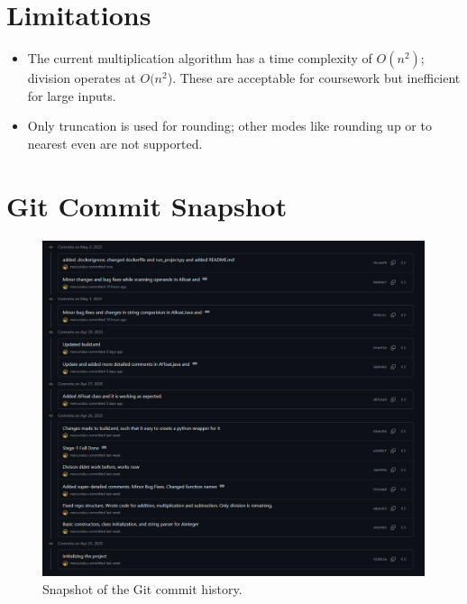 \documentclass[12pt]{article}
\begin{document}
\section{Limitations}
\begin{itemize}
  \item The current multiplication algorithm has a time complexity of \(O(n^2)\); division operates at \(O(n^2 \)). These are acceptable for coursework but inefficient for large inputs.
  \item Only truncation is used for rounding; other modes like rounding up or to nearest even are not supported.
\end{itemize}

\section{Git Commit Snapshot}
\begin{figure}[h]
  \centering
  \includegraphics[width=0.9\linewidth]{image.png}
  \caption{Snapshot of the Git commit history.}
  \label{fig:git}
\end{figure}

\end{document}
